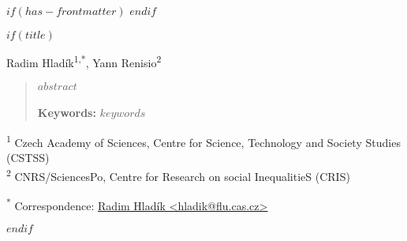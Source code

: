 $if(has-frontmatter)$
\frontmatter
$endif$

$if(title)$
\makeatletter
\maketitle

{\Large\centering Radim Hladík\textsuperscript{1,*}, Yann Renisio\textsuperscript{2}\\}


\begin{abstract}

\textit{
$abstract$
}
\\
\textbf{\\Keywords:} \textit{$keywords$}


\end{abstract}


\textsuperscript{1} Czech Academy of Sciences, Centre for Science,
Technology and Society Studies (CSTSS)\\
\textsuperscript{2} CNRS/SciencesPo, Centre for Research on social
InequalitieS (CRIS)

\textsuperscript{*} Correspondence:
\href{mailto:hladik@flu.cas.cz}{Radim Hladík
\textless{}hladik@flu.cas.cz\textgreater{}}


\newpage
\makeatother
$endif$